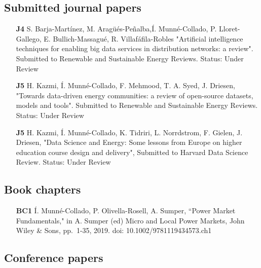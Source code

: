 \subsection*{Submitted journal papers}
\begin{itemize}
	\item [\textbf{J4}] S. Barja-Mart\'{i}nez, M. Arag\"{u}\'{e}s-Pe\~{n}alba,\'{I}. Munn\'{e}-Collado, P. Lloret-Gallego, E. Bullich-Massagu\'{e}, R. Villaf\'{a}fila-Robles "Artificial intelligence techniques for enabling big data services in distribution networks: a review". Submitted to Renewable and Sustainable Energy Reviews. Status: Under Review
	\item [\textbf{J5}] H. Kazmi, \'{I}. Munn\'{e}-Collado, F. Mehmood, T. A. Syed, J. Driesen, "Towards data-driven energy communities: a review of open-source datasets, models and tools". Submitted to Renewable and Sustainable Energy Reviews. Status: Under Review
	\item [\textbf{J5}] H. Kazmi, \'{I}. Munn\'{e}-Collado, K. Tidriri, L. Norrdstrom, F. Gielen, J. Driesen, "Data Science and Energy: Some lessons from Europe on higher education course design and delivery", Submitted to Harvard Data Science Review. Status: Under Review
\end{itemize}

	
\subsection*{Book chapters}

\begin{itemize}
	\item[\textbf{BC1}] \'{I}. Munn\'{e}-Collado, P. Olivella-Rosell, A. Sumper, ``Power Market Fundamentals," in A. Sumper (ed) Micro and Local Power Markets, John Wiley \& Sons, pp.~1-35, 2019. doi: 10.1002/9781119434573.ch1
\end{itemize}	


\subsection*{Conference papers}

